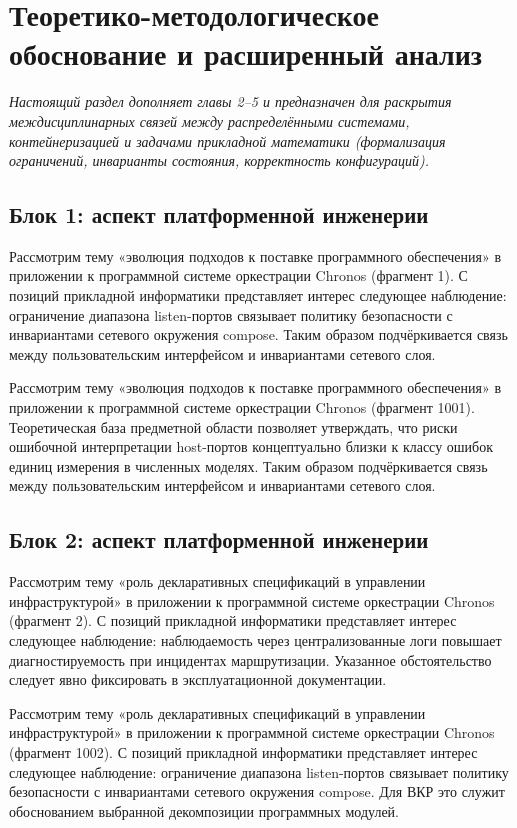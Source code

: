 \section{Теоретико-методологическое обоснование и расширенный анализ}
\textit{Настоящий раздел дополняет главы 2--5 и предназначен для раскрытия междисциплинарных связей между распределёнными системами, контейнеризацией и задачами прикладной математики (формализация ограничений, инварианты состояния, корректность конфигураций).}

\subsection{Блок 1: аспект платформенной инженерии}
 Рассмотрим тему «эволюция подходов к поставке программного обеспечения» в приложении к программной системе оркестрации Chronos (фрагмент 1). С позиций прикладной информатики представляет интерес следующее наблюдение: ограничение диапазона listen-портов связывает политику безопасности с инвариантами сетевого окружения compose. Таким образом подчёркивается связь между пользовательским интерфейсом и инвариантами сетевого слоя.

 Рассмотрим тему «эволюция подходов к поставке программного обеспечения» в приложении к программной системе оркестрации Chronos (фрагмент 1001). Теоретическая база предметной области позволяет утверждать, что риски ошибочной интерпретации host-портов концептуально близки к классу ошибок единиц измерения в численных моделях. Таким образом подчёркивается связь между пользовательским интерфейсом и инвариантами сетевого слоя.

\subsection{Блок 2: аспект платформенной инженерии}
 Рассмотрим тему «роль декларативных спецификаций в управлении инфраструктурой» в приложении к программной системе оркестрации Chronos (фрагмент 2). С позиций прикладной информатики представляет интерес следующее наблюдение: наблюдаемость через централизованные логи повышает диагностируемость при инцидентах маршрутизации. Указанное обстоятельство следует явно фиксировать в эксплуатационной документации.

 Рассмотрим тему «роль декларативных спецификаций в управлении инфраструктурой» в приложении к программной системе оркестрации Chronos (фрагмент 1002). С позиций прикладной информатики представляет интерес следующее наблюдение: ограничение диапазона listen-портов связывает политику безопасности с инвариантами сетевого окружения compose. Для ВКР это служит обоснованием выбранной декомпозиции программных модулей.

